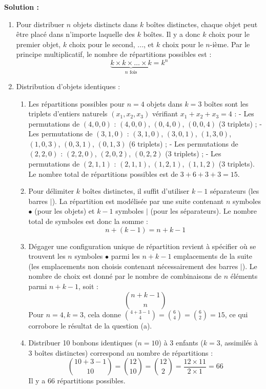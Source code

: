 \textbf{Solution :}
\begin{enumerate}
    \item Pour distribuer $n$ objets distincts dans $k$ boîtes distinctes, chaque objet peut être placé dans n'importe laquelle des $k$ boîtes. Il y a donc $k$ choix pour le premier objet, $k$ choix pour le second, ..., et $k$ choix pour le $n$-ième.
    Par le principe multiplicatif, le nombre de répartitions possibles est :
    \[
    \underbrace{k \times k \times \dots \times k}_{n \text{ fois}} = k^n
    \]
    
    \item Distribution d'objets identiques :
    \begin{enumerate}
        \item Les répartitions possibles pour $n=4$ objets dans $k=3$ boîtes sont les triplets d'entiers naturels $(x_1, x_2, x_3)$ vérifiant $x_1+x_2+x_3=4$ :
        - Les permutations de $(4,0,0)$ : $(4,0,0)$, $(0,4,0)$, $(0,0,4)$ (3 triplets) ;
        - Les permutations de $(3,1,0)$ : $(3,1,0)$, $(3,0,1)$, $(1,3,0)$, $(1,0,3)$, $(0,3,1)$, $(0,1,3)$ (6 triplets) ;
        - Les permutations de $(2,2,0)$ : $(2,2,0)$, $(2,0,2)$, $(0,2,2)$ (3 triplets) ;
        - Les permutations de $(2,1,1)$ : $(2,1,1)$, $(1,2,1)$, $(1,1,2)$ (3 triplets).
        Le nombre total de répartitions possibles est de $3 + 6 + 3 + 3 = 15$.
        
        \item Pour délimiter $k$ boîtes distinctes, il suffit d'utiliser $k-1$ séparateurs (les barres $|$). La répartition est modélisée par une suite contenant $n$ symboles $\bullet$ (pour les objets) et $k-1$ symboles $\mid$ (pour les séparateurs).
        Le nombre total de symboles est donc la somme :
        \[
        n + (k-1) = n+k-1
        \]
        
        \item Dégager une configuration unique de répartition revient à spécifier où se trouvent les $n$ symboles $\bullet$ parmi les $n+k-1$ emplacements de la suite (les emplacements non choisis contenant nécessairement des barres $\mid$).
        Le nombre de choix est donné par le nombre de combinaisons de $n$ éléments parmi $n+k-1$, soit :
        \[
        \binom{n+k-1}{n}
        \]
        Pour $n=4, k=3$, cela donne $\binom{4+3-1}{4} = \binom{6}{4} = \binom{6}{2} = 15$, ce qui corrobore le résultat de la question (a).
        
        \item Distribuer 10 bonbons identiques ($n=10$) à 3 enfants ($k=3$, assimilés à 3 boîtes distinctes) correspond au nombre de répartitions :
        \[
        \binom{10+3-1}{10} = \binom{12}{10} = \binom{12}{2} = \frac{12 \times 11}{2 \times 1} = 66
        \]
        Il y a 66 répartitions possibles.
    \end{enumerate}
\end{enumerate}

